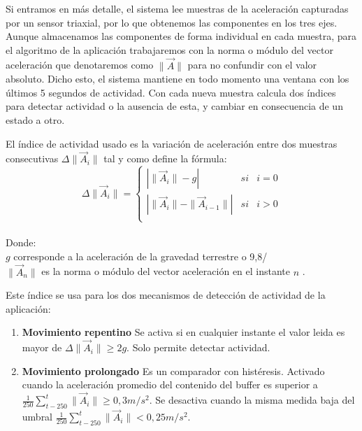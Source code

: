 
Si entramos en más detalle, el sistema lee muestras de la aceleración capturadas por un sensor triaxial, por lo que obtenemos las componentes en los tres ejes. Aunque almacenamos las componentes de forma individual en cada muestra, para el algoritmo de la aplicación trabajaremos con la norma o módulo del vector aceleración que denotaremos como $\|\vec{A}\|$ para no confundir con el valor absoluto. Dicho esto, el sistema mantiene en todo momento una ventana con los últimos 5 segundos de actividad. Con cada nueva muestra calcula dos índices para detectar actividad o la ausencia de esta, y cambiar en consecuencia de un estado a otro.

El índice de actividad usado es la variación de aceleración entre dos muestras consecutivas $\Delta \|\vec{A}_i\|$ tal y como define la fórmula:
\[
  \Delta \|\vec{A}_{i}\|=\left\{
    \begin{array}{lcl}
      |\|\vec{A}_i\| - g|       & si & i = 0 \\
      |\|\vec{A}_i\| - \|\vec{A}_{i-1}\|| & si & i > 0 \\
    \end{array}
    \right.
\]\\

Donde:\\
$g$ corresponde a la aceleración de la gravedad terrestre o 9,8/\\
$\|\vec{A}_n\|$ es la norma o módulo del vector aceleración en el instante $n$ .

Este índice se usa para los dos mecanismos de detección de actividad de la aplicación:

\begin{enumerate}
  \item \textbf{Movimiento repentino} Se activa si en cualquier instante el valor leida es mayor de $\Delta \|\vec{A}_i\|\geq2g$. Solo permite detectar actividad.
  \item \textbf{Movimiento prolongado} Es un comparador con histéresis. Activado cuando la aceleración promedio del contenido del buffer es superior a $\frac{1}{250}\sum_{t-250}^t\|\vec{A}_i\|\geq0,3m/s^2$. Se desactiva cuando la misma medida baja del umbral $\frac{1}{250}\sum_{t-250}^t\|\vec{A}_i\|<0,25m/s^2$.
\end{enumerate}

